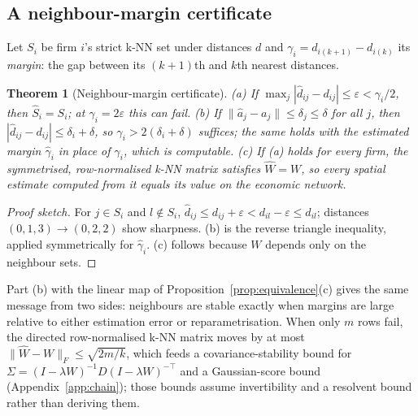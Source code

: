 \documentclass[letterpaper]{article} %
\newtheorem{theorem}[proposition]{Theorem}
\theoremstyle{definition}
\newcommand{\norm}[1]{\lVert #1\rVert}
\begin{document}
\subsection{A neighbour-margin certificate}
Let $S_i$ be firm $i$'s strict k-NN set under distances $d$ and
$\gamma_i=d_{i(k+1)}-d_{i(k)}$ its \emph{margin}: the gap between its $(k{+}1)$th
and $k$th nearest distances.
\begin{theorem}[Neighbour-margin certificate]\label{thm:margin}
  (a) If $\max_j|\hat d_{ij}-d_{ij}|\le\varepsilon<\gamma_i/2$, then
  $\hat S_i=S_i$; at $\gamma_i=2\varepsilon$ this can fail.
  (b) If $\norm{\hat a_j-a_j}\le\delta_j\le\delta$ for all $j$, then
  $|\hat d_{ij}-d_{ij}|\le\delta_i+\delta$, so $\gamma_i>2(\delta_i+\delta)$
  suffices; the same holds with the estimated margin $\hat\gamma_i$ in place of
  $\gamma_i$, which is computable.
  (c) If (a) holds for every firm, the symmetrised, row-normalised k-NN matrix
  satisfies $\hat W=W$, so every spatial estimate computed from it equals its
  value on the economic network.
\end{theorem}
\begin{proof}[Proof sketch]
  For $j\in S_i$ and $l\notin S_i$, $\hat d_{ij}\le d_{ij}+\varepsilon<
  d_{il}-\varepsilon\le\hat d_{il}$; distances $(0,1,3)\to(0,2,2)$ show
  sharpness. (b) is the reverse triangle inequality, applied symmetrically for
  $\hat\gamma_i$. (c) follows because $W$ depends only on the neighbour sets.
\end{proof}
Part (b) with the linear map of Proposition~\ref{prop:equivalence}(c) gives the
same message from two sides: neighbours are stable exactly when margins are
large relative to either estimation error or reparametrisation. When only
$m$ rows fail, the directed row-normalised k-NN matrix moves by at most
$\norm{\hat W-W}_F\le\sqrt{2m/k}$, which feeds a covariance-stability bound
for $\Sigma=(I-\lambda W)^{-1}D(I-\lambda W)^{-\top}$ and a Gaussian-score
bound (Appendix~\ref{app:chain}); those bounds assume invertibility and a
resolvent bound rather than deriving them.
\end{document}
